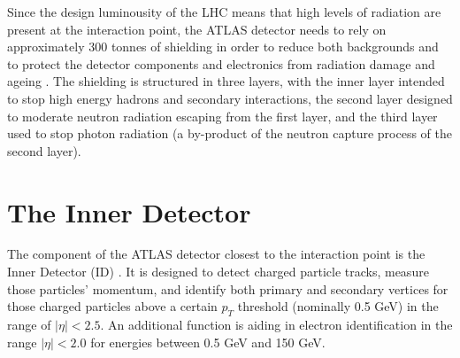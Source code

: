 Since the design luminousity of the LHC means that high levels of radiation are present at the interaction point, the ATLAS detector needs to rely on approximately 300 tonnes of shielding in order to reduce both backgrounds and to protect the detector components and electronics from radiation damage and ageing \cite{ATLAS}. The shielding is structured in three layers, with the inner layer intended to stop high energy hadrons and secondary interactions, the second layer designed to moderate neutron radiation escaping from the first layer, and the third layer used to stop photon radiation (a by-product of the neutron capture process of the second layer).

\section{The Inner Detector}
The component of the ATLAS detector closest to the interaction point is the Inner Detector (ID) \cite{ATLAS}. It is designed to detect charged particle tracks, measure those particles' momentum, and identify both primary and secondary vertices for those charged particles above a certain $p_{T}$ threshold (nominally 0.5 GeV) in the range of $| \eta| < 2.5$. An additional function is aiding in electron identification in the range $| \eta | < 2.0$ for energies between 0.5 GeV and 150 GeV.

